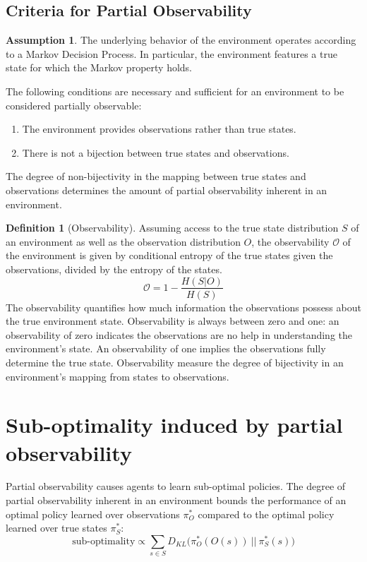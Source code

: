 \documentclass{article} %
\theoremstyle{definition}
\newtheorem{definition}{Definition}[section]
\newtheorem{assumption}{Assumption}
\begin{document}
\subsection{Criteria for Partial Observability}
\begin{assumption}
The underlying behavior of the environment operates according to a
Markov Decision Process. In particular, the environment features a
true state for which the Markov property holds.
\end{assumption}

The following conditions are necessary and sufficient for an
environment to be considered partially observable:

\begin{enumerate}
\item The environment provides observations rather than true states.
\item There is not a bijection between true states and observations.
\end{enumerate}

The degree of non-bijectivity in the mapping between true states and
observations determines the amount of partial observability inherent
in an environment.

\begin{definition}[Observability]
Assuming access to the true state distribution $S$ of an environment
as well as the observation distribution $O$, the observability
$\mathcal{O}$ of the environment is given by conditional entropy of
the true states given the observations, divided by the entropy of the
states.
\[
\mathcal{O} = 1 - \frac{H(S|O)}{H(S)}
\]
The observability quantifies how much information the observations
possess about the true environment state. Observability is always
between zero and one: an observability of zero indicates the
observations are no help in understanding the environment's state. An
observability of one implies the observations fully determine the true
state. Observability measure the degree of bijectivity in an
environment's mapping from states to observations.
\end{definition}


\section{Sub-optimality induced by partial observability}
Partial observability causes agents to learn sub-optimal policies. The
degree of partial observability inherent in an environment bounds the
performance of an optimal policy learned over observations $\pi_O^*$
compared to the optimal policy learned over true states $\pi_S^*$:
\[
\textrm{sub-optimality} \propto \sum_{s\in S} D_{KL}\big(\pi_O^*(O(s))\ ||\ \pi_S^*(s)\big)
\]
\end{document}

